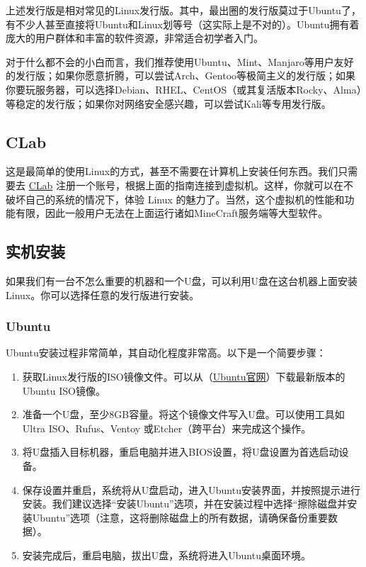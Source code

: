 上述发行版是相对常见的Linux发行版。其中，最出圈的发行版莫过于Ubuntu了，有不少人甚至直接将Ubuntu和Linux划等号（这实际上是不对的）。Ubuntu拥有着庞大的用户群体和丰富的软件资源，非常适合初学者入门。

对于什么都不会的小白而言，我们推荐使用Ubuntu、Mint、Manjaro等用户友好的发行版；如果你愿意折腾，可以尝试Arch、Gentoo等极简主义的发行版；如果你要玩服务器，可以选择Debian、RHEL、CentOS（或其复活版本Rocky、Alma）等稳定的发行版；如果你对网络安全感兴趣，可以尝试Kali等专用发行版。

\subsection{CLab}

这是最简单的使用Linux的方式，甚至不需要在计算机上安装任何东西。我们只需要去 \href{https://clab.pku.edu.cn/}{CLab} 注册一个账号，根据上面的指南连接到虚拟机。这样，你就可以在不破坏自己的系统的情况下，体验 Linux 的魅力了。当然，这个虚拟机的性能和功能有限，因此一般用户无法在上面运行诸如MineCraft服务端等大型软件。

\subsection{实机安装}

如果我们有一台不怎么重要的机器和一个U盘，可以利用U盘在这台机器上面安装Linux。你可以选择任意的发行版进行安装。

\subsubsection{Ubuntu}

Ubuntu安装过程非常简单，其自动化程度非常高。以下是一个简要步骤：

\begin{enumerate}
  \item 获取Linux发行版的ISO镜像文件。可以从（\href{https://ubuntu.com/download}{Ubuntu官网}）下载最新版本的Ubuntu ISO镜像。
  \item 准备一个U盘，至少8GB容量。将这个镜像文件写入U盘。可以使用工具如Ultra ISO、Rufus、Ventoy 或Etcher（跨平台）来完成这个操作。
  \item 将U盘插入目标机器，重启电脑并进入BIOS设置，将U盘设置为首选启动设备。
  \item 保存设置并重启，系统将从U盘启动，进入Ubuntu安装界面，并按照提示进行安装。我们建议选择“安装Ubuntu”选项，并在安装过程中选择“擦除磁盘并安装Ubuntu”选项（注意，这将删除磁盘上的所有数据，请确保备份重要数据）。
  \item 安装完成后，重启电脑，拔出U盘，系统将进入Ubuntu桌面环境。
\end{enumerate}

